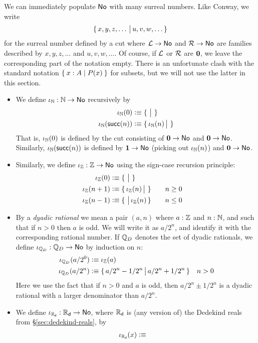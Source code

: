 We can immediately populate $\mathsf{No}$ with many surreal numbers.
Like Conway, we write
\[\{\,x,y,z,\dots\,\big|\,u,v,w,\dots\,\}\]
for the surreal number defined by a cut where $\mathcal{L}\to\mathsf{No}$ and $\mathcal{R}\to\mathsf{No}$ are families described by $x,y,z,\dots$ and $u,v,w,\dots$.
Of course, if $\mathcal{L}$ or $\mathcal{R}$ are $\mathbf{0}$, we leave the corresponding part of the notation empty.
There is an unfortunate clash with the standard notation $\Set{x:A | P(x)}$ for subsets, but we will not use the latter in this section.
\begin{itemize}
\item We define $\iota_{\mathbb{N}}:\mathbb{N}\to\mathsf{No}$ recursively by
  \begin{align*}
    \iota_{\mathbb{N}}(0) &\vcentcolon\equiv \{\,\,\big|\,\,\}\\
    \iota_\mathbb{N}(\mathsf{succ}(n)) &\vcentcolon\equiv \{\,\iota_\mathbb{N}(n)\,\big|\,\,\}
  \end{align*}
  That is, $\iota_\mathbb{N}(0)$ is defined by the cut consisting of $\mathbf{0}\to\mathsf{No}$ and $\mathbf{0}\to\mathsf{No}$.
  Similarly, $\iota_\mathbb{N}(\mathsf{succ}(n))$ is defined by $\mathbf{1}\to\mathsf{No}$ (picking out $\iota_\mathbb{N}(n)$) and $\mathbf{0}\to\mathsf{No}$.
\item Similarly, we define $\iota_{\mathbb{Z}}:\mathbb{Z}\to\mathsf{No}$ using the sign-case recursion principle:
  \begin{alignat*}{2}
    \iota_{\mathbb{Z}}(0) &\vcentcolon\equiv \{\,\,\big|\,\,\}\\
    \iota_\mathbb{Z}(n+1) &\vcentcolon\equiv \{\,\iota_\mathbb{Z}(n)\,\big|\,\,\} &&\quad n\ge 0\\
    \iota_\mathbb{Z}(n-1) &\vcentcolon\equiv \{\,\,\big|\,\iota_\mathbb{Z}(n)\,\} &&\quad n\le 0
  \end{alignat*}
\item By a \emph{dyadic rational} we mean a pair $(a,n)$ where $a:\mathbb{Z}$ and $n:\mathbb{N}$, and such that if $n>0$ then $a$ is odd.
  We will write it as $a/2^n$, and identify it with the corresponding rational number.
  If $\mathbb{Q}_D$ denotes the set of dyadic rationals, we define $\iota_{\mathbb{Q}_D}:\mathbb{Q}_D\to\mathsf{No}$ by induction on $n$:
  \begin{align*}
    \iota_{\mathbb{Q}_D}(a/2^0) &\vcentcolon\equiv \iota_\mathbb{Z}(a)\\
    \iota_{\mathbb{Q}_D}(a/2^n) &\vcentcolon\equiv \{\,a/2^n - 1/2^n\,\big|\,a/2^n + 1/2^n\,\} \quad n>0
  \end{align*}
  Here we use the fact that if $n>0$ and $a$ is odd, then $a/2^n \pm 1/2^n$ is a dyadic rational with a larger denominator than $a/2^n$.
\item We define $\iota_{\mathbb{R}_\mathsf{d}}:\mathbb{R}_\mathsf{d}\to\mathsf{No}$, where $\mathbb{R}_\mathsf{d}$ is (any version of) the Dedekind reals from \S\ref{sec:dedekind-reals}, by
  \begin{align*}
    \iota_{\RD}(x) &\defeq

\end{align*}
\end{itemize}
